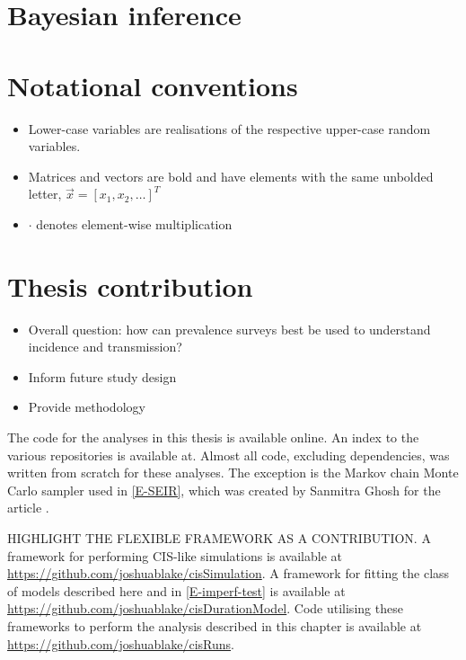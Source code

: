\documentclass[thesis.tex]{subfiles}
\begin{document}
\section{Bayesian inference}

\section{Notational conventions}

\begin{itemize}
    \item Lower-case variables are realisations of the respective upper-case random variables.
    \item Matrices and vectors are bold and have elements with the same unbolded letter, \eg $\vec{x} = [x_1, x_2, \dots]^T$
    \item $\cdot$ denotes element-wise multiplication
\end{itemize}

\section{Thesis contribution}


\begin{itemize}
    \item Overall question: how can prevalence surveys best be used to understand incidence and transmission?
    \item Inform future study design
    \item Provide methodology
\end{itemize}

The code for the analyses in this thesis is available online.
An index to the various repositories is available at.
Almost all code, excluding dependencies, was written from scratch for these analyses.
The exception is the Markov chain Monte Carlo sampler used in \cref{E-SEIR}, which was created by Sanmitra Ghosh for the article \textcite{ghoshApproximate}.

HIGHLIGHT THE FLEXIBLE FRAMEWORK AS A CONTRIBUTION.
A framework for performing CIS-like simulations is available at \url{https://github.com/joshuablake/cisSimulation}.
A framework for fitting the class of models described here and in \cref{E-imperf-test} is available at \url{https://github.com/joshuablake/cisDurationModel}.
Code utilising these frameworks to perform the analysis described in this chapter is available at \url{https://github.com/joshuablake/cisRuns}.
\end{document}
